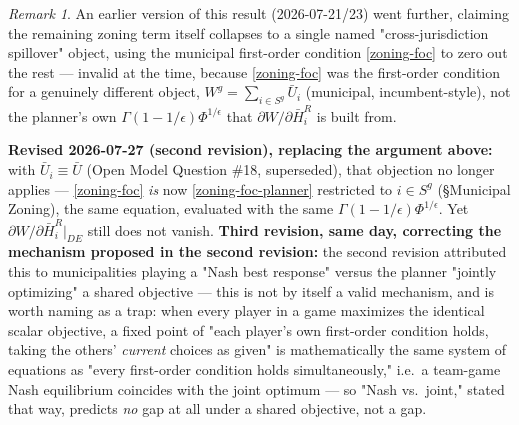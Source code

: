\documentclass[12pt, a4paper]{article}
\theoremstyle{definition}
\theoremstyle{remark}
\newtheorem*{remark}{Remark}
\begin{document}
\begin{remark}
An earlier version of this result (2026-07-21/23) went further, claiming the remaining zoning term itself collapses to a single named "cross-jurisdiction spillover" object, using the municipal first-order condition \eqref{zoning-foc} to zero out the rest — invalid at the time, because \eqref{zoning-foc} was the first-order condition for a genuinely different object, $W^g=\sum_{i\in S^g}\bar U_i$ (municipal, incumbent-style), not the planner's own $\Gamma(1-1/\epsilon)\Phi^{1/\epsilon}$ that $\partial W/\partial\bar H_i^R$ is built from.

\textbf{Revised 2026-07-27 (second revision), replacing the argument above:} with $\bar U_i\equiv\bar U$ (Open Model Question \#18, superseded), that objection no longer applies — \eqref{zoning-foc} \emph{is} now \eqref{zoning-foc-planner} restricted to $i\in S^g$ (\S Municipal Zoning), the same equation, evaluated with the same $\Gamma(1-1/\epsilon)\Phi^{1/\epsilon}$. Yet $\partial W/\partial\bar H_i^R|_{DE}$ still does not vanish. \textbf{Third revision, same day, correcting the mechanism proposed in the second revision:} the second revision attributed this to municipalities playing a "Nash best response" versus the planner "jointly optimizing" a shared objective — this is not by itself a valid mechanism, and is worth naming as a trap: when every player in a game maximizes the identical scalar objective, a fixed point of "each player's own first-order condition holds, taking the others' \emph{current} choices as given" is mathematically the same system of equations as "every first-order condition holds simultaneously," i.e.\ a team-game Nash equilibrium coincides with the joint optimum — so "Nash vs.\ joint," stated that way, predicts \emph{no} gap at all under a shared objective, not a gap.


\end{remark}
\end{document}
